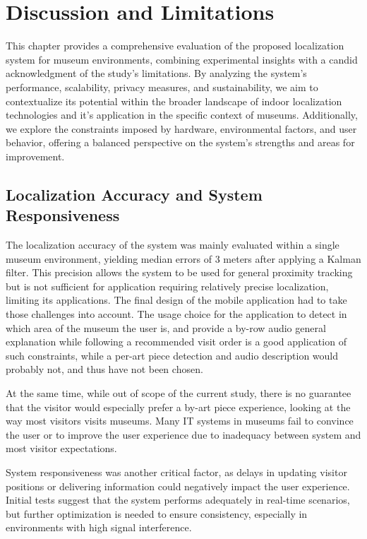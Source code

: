 \chapter{Discussion and Limitations}
\label{chap:discussion}

This chapter provides a comprehensive evaluation of the proposed localization system for museum environments, combining experimental insights with a candid acknowledgment of the study’s limitations. By analyzing the system’s performance, scalability, privacy measures, and sustainability, we aim to contextualize its potential within the broader landscape of indoor localization technologies and it's application in the specific context of museums. Additionally, we explore the constraints imposed by hardware, environmental factors, and user behavior, offering a balanced perspective on the system’s strengths and areas for improvement.

\section{Localization Accuracy and System Responsiveness}
The localization accuracy of the system was mainly evaluated within a single museum environment, yielding median errors of 3 meters after applying a Kalman filter. This precision allows the system to be used for general proximity tracking but is not sufficient for application requiring relatively precise localization, limiting its applications. The final design of the mobile application had to take those challenges into account. The usage choice for the application to detect in which area of the museum the user is, and provide a by-row audio general explanation while following a recommended visit order is a good application of such constraints, while a per-art piece detection and audio description would probably not, and thus have not been chosen.

At the same time, while out of scope of the current study, there is no guarantee that the visitor would especially prefer a by-art piece experience, looking at the way most visitors visits museums. Many IT systems in museums fail to convince the user or to improve the user experience due to inadequacy between system and most visitor expectations. %

System responsiveness was another critical factor, as delays in updating visitor positions or delivering information could negatively impact the user experience. Initial tests suggest that the system performs adequately in real-time scenarios, but further optimization is needed to ensure consistency, especially in environments with high signal interference.

